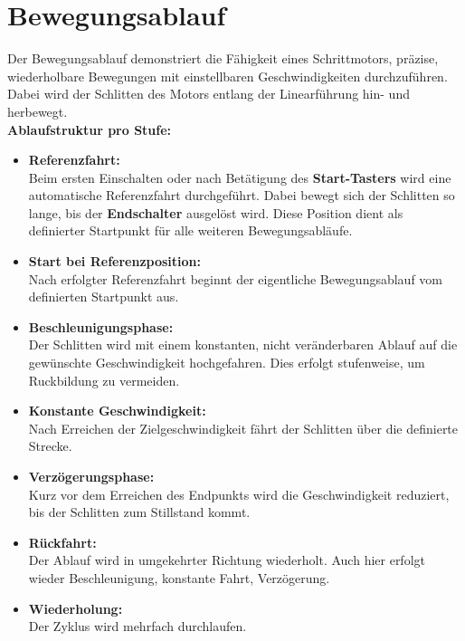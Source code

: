 \documentclass[a4paper,12pt,final]{report}
\begin{document}
\section{Bewegungsablauf}

\setlength{\leftskip}{1.5em}

Der Bewegungsablauf demonstriert die Fähigkeit eines Schrittmotors, präzise, wiederholbare Bewegungen mit einstellbaren Geschwindigkeiten durchzuführen. Dabei wird der Schlitten des Motors entlang der Linearführung hin- und herbewegt.  \\[0.75cm]

\noindent\textbf{Ablaufstruktur pro Stufe:}

\begin{itemize}[leftmargin=1.5em, itemsep=1em, topsep=0.5em]
	\item \textbf{Referenzfahrt:} \\
	Beim ersten Einschalten oder nach Betätigung des \textbf{Start-Tasters} wird eine automatische Referenzfahrt durchgeführt. Dabei bewegt sich der Schlitten so lange, bis der \textbf{Endschalter} ausgelöst wird. Diese Position dient als definierter Startpunkt für alle weiteren Bewegungsabläufe.
	
	\item \textbf{Start bei Referenzposition:} \\
	Nach erfolgter Referenzfahrt beginnt der eigentliche Bewegungsablauf vom definierten Startpunkt aus.
	
	\item \textbf{Beschleunigungsphase:} \\
	Der Schlitten wird mit einem konstanten, nicht veränderbaren Ablauf auf die gewünschte Geschwindigkeit hochgefahren. Dies erfolgt stufenweise, um Ruckbildung zu vermeiden.
	
	\item \textbf{Konstante Geschwindigkeit:} \\
	Nach Erreichen der Zielgeschwindigkeit fährt der Schlitten über die definierte Strecke.
	
	\item \textbf{Verzögerungsphase:} \\
	Kurz vor dem Erreichen des Endpunkts wird die Geschwindigkeit reduziert, bis der Schlitten zum Stillstand kommt.
	
	\item \textbf{Rückfahrt:} \\
	Der Ablauf wird in umgekehrter Richtung wiederholt. Auch hier erfolgt wieder Beschleunigung, konstante Fahrt, Verzögerung.
	
	\item \textbf{Wiederholung:} \\
	Der Zyklus wird mehrfach durchlaufen.
\end{itemize}
\end{document}
